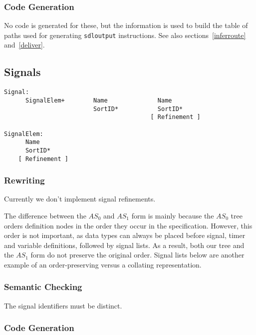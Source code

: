 \subsubsection{Code Generation}

No code is generated for these, but the information is used
to build the table of paths used for generating {\tt sdloutput}
instructions. See also sections~\ref{inferroute} and~\ref{deliver}.

\subsection{Signals}

\begin{verbatim}
Signal:
      SignalElem+        Name              Name
                         SortID*           SortID*
                                         [ Refinement ]

SignalElem:
      Name               
      SortID*            
    [ Refinement ]       
\end{verbatim}

\subsubsection{Rewriting}
\label{collate}

Currently we don't implement signal refinements.

The difference between the $AS_0$ and $AS_1$ form is mainly because the
$AS_0$ tree orders definition nodes in the order they occur in the
specification. 
However, this order is not important, as data types
can always be placed before signal, timer and variable definitions,
followed by signal lists. 
As a result, both our tree and the $AS_1$
form do not preserve the original order. 
Signal lists below are
another example of an order-preserving versus a collating
representation.

\subsubsection{Semantic Checking}

The signal identifiers must be distinct.

\subsubsection{Code Generation}

